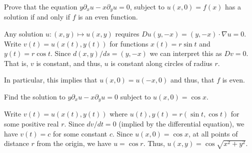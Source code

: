 \documentclass[12 pt, letterpaper]{hmcpset}
\begin{document}
\pagebreak

\begin{problem}[4.]
	Prove that the equation $y \partial_{x} u - x \partial_{y} u = 0$, subject to $u(x, 0) = f(x)$ has a solution if and only if $f$ is an even function.
\end{problem}

\begin{solution}
	Any solution $u : (x, y) \mapsto u(x, y)$ requires $Du(y, -x) = (y, -x) \cdot \nabla u = 0$. Write $v(t) = u(x(t), y(t))$ for functions $x(t) = r \sin{t}$ and $y(t) = r \cos{t}$. Since $d(x, y) / ds = (y, -x)$ we can interpret this as $Dv = 0$. That is, $v$ is constant, and thus, $u$ is constant along circles of radius $r$.

	In particular, this implies that $u(x, 0) = u(-x, 0)$ and thus, that $f$ is even.
\end{solution}

\pagebreak

\begin{problem}[5.]
	Find the solution to $y \partial_{x} u - x \partial_{y} u = 0$ subject to $u(x, 0) = \cos{x}$.
\end{problem}

\begin{solution}
	Write $v(t) = u(x(t), y(t))$ where $u(t), y(t) = r (\sin{t}, \cos{t})$ for some positive real $r$. Since $dv / dt = 0$ (implied by the differential equation), we have $v(t) = c$ for some constant $c$. Since $u(x, 0) = \cos{x}$, at all points of distance $r$ from the origin, we have $u = \cos{r}$. Thus, $u(x, y) = \cos{\sqrt{x^{2} + y^{2}}}$.
\end{solution}
\end{document}
